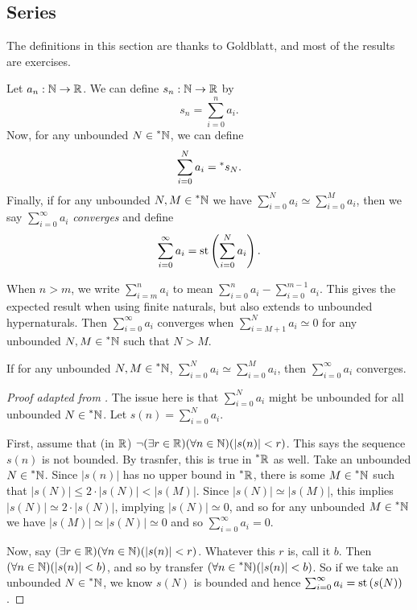 \subsection{Series}
The definitions in this section are thanks to Goldblatt, and most of the results are exercises.

Let $a_n: \mathbb{N} \to \mathbb{R}$. We can define $s_n: \mathbb{N} \to \mathbb{R}$ by 
\[ s_n = \sum_{i=0}^n a_i. \]
Now, for any unbounded $N \in \prescript{*}{}{\mathbb{N}}$, we can define
\[ \sum_{i=0}^N a_i = \prescript{*}{}{s_N}. \]
Finally, if for any unbounded $N, M \in \prescript{*}{}{\mathbb{N}}$ we have $\sum_{i=0}^N a_i \simeq \sum_{i=0}^M a_i$, then we say $\sum_{i=0}^\infty a_i$ \textit{converges} and define
\[ \sum_{i=0}^\infty a_i = \operatorname{st}\left(\sum_{i=0}^N a_i\right). \] 

When $n > m$, we write $\sum_{i=m}^n a_i$ to mean $\sum_{i=0}^n a_i - \sum_{i=0}^{m-1} a_i$. This gives the expected result when using finite naturals, but also extends to unbounded hypernaturals. Then $\sum_{i=0}^\infty a_i$ converges when $\sum_{i=M+1}^N a_i \simeq 0$ for any unbounded $N, M \in \prescript{*}{}{\mathbb{N}}$ such that $N > M$.

\begin{thm}
    If for any unbounded $N, M \in \prescript{*}{}{\mathbb{N}}$, $\sum_{i=0}^N a_i \simeq \sum_{i=0}^M a_i$, then $\sum_{i=0}^\infty a_i$ converges.
\end{thm}

\begin{proof}[Proof adapted from ]
    The issue here is that $\sum_{i=0}^N a_i$ might be unbounded for all unbounded $N \in \prescript{*}{}{\mathbb{N}}$. Let $s(n) = \sum_{i=0}^N a_i$. 
    
    First, assume that (in $\mathbb{R}$) $\neg (\exists r \in \mathbb{R}) (\forall n \in \mathbb{N})(|s(n)| < r)$. This says the sequence $s(n)$ is not bounded. By trasnfer, this is true in $\prescript{*}{}{\mathbb{R}}$ as well. Take an unbounded $N \in \prescript{*}{}{\mathbb{N}}$. Since $|s(n)|$ has no upper bound in $\prescript{*}{}{\mathbb{R}}$, there is some $M \in \prescript{*}{}{\mathbb{N}}$ such that $|s(N)| \leq 2 \cdot |s(N)| < |s(M)|$. Since $|s(N)| \simeq |s(M)|$, this implies $|s(N)| \simeq 2 \cdot |s(N)|$, implying $|s(N)| \simeq 0$, and so for any unbounded $M \in \prescript{*}{}{\mathbb{N}}$ we have $|s(M)| \simeq |s(N)| \simeq 0$ and so $\sum_{i=0}^\infty a_i = 0$.

    Now, say $(\exists r \in \mathbb{R}) (\forall n \in \mathbb{N})(|s(n)| < r)$. Whatever this $r$ is, call it $b$. Then $(\forall n \in \mathbb{N})(|s(n)| < b)$, and so by transfer $(\forall n \in \prescript{*}{}{\mathbb{N}})(|s(n)| < b)$. So if we take an unbounded $N \in \prescript{*}{}{\mathbb{N}}$, we know $s(N)$ is bounded and hence $\sum_{i=0}^\infty a_i = \operatorname{st}\left(s(N)\right)$.
\end{proof}

